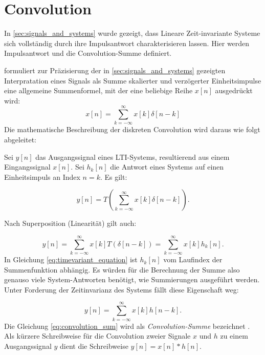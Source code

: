 \section{Convolution} 
\label{sec:convolution}
In \ref{sec:signals_and_systems} wurde gezeigt, dass Lineare Zeit-invariante Systeme sich vollständig durch ihre Impulsantwort
charakterisieren lassen. Hier werden Impulsantwort und die Convolution-Summe definiert.

\cite[Seite 11]{oppenheim1999} formuliert zur Präzisierung der in \ref{sec:signals_and_systems} gezeigten Interpratation eines Signals als Summe skalierter und verzögerter Einheitsimpulse eine allgemeine Summenformel, mit der eine beliebige Reihe $x[n]$ ausgedrückt wird:
\begin{equation}
    x[n]=\sum_{k=-\infty}^\infty x[k]\delta[n-k]
    \label{eq:scaled_unit_sum}
\end{equation}
Die mathematische Beschreibung der diskreten Convolution wird daraus wie folgt abgeleitet: 

Sei $y[n]$ das Ausgangssignal eines LTI-Systems, resultierend aus einem Eingangssignal $x[n]$. Sei $h_k[n]$ die Antwort eines Systems
auf einen Einheitsimpuls an Index $n=k$. Es gilt:

\begin{equation}
    y[n]=T\left( \sum_{k=-\infty}^{\infty}x[k]\delta[n-k] \right).
\end{equation}

Nach Superposition (Linearität) gilt auch:

\begin{equation}
    y[n]=\sum_{k=-\infty}^{\infty}x[k]T(\delta[n-k])=\sum_{k=-\infty}^{\infty}x[k]h_k[n].
    \label{eq:timevariant_equation}
\end{equation}
In Gleichung \ref{eq:timevariant_equation} ist $h_k[n]$ vom Laufindex der Summenfunktion abhängig. Es würden für die Berechnung der Summe also
genauso viele System-Antworten benötigt, wie Summierungen ausgeführt werden.
Unter Forderung der Zeitinvarianz des Systems fällt diese Eigenschaft weg:

\begin{equation}
    y[n]=\sum_{k=-\infty}^{\infty}x[k]h[n-k].
    \label{eq:convolution_sum}
\end{equation}
Die Gleichung \ref{eq:convolution_sum} wird als \textit{Convolution-Summe} bezeichnet \cite[Seite 22f]{oppenheim1999}. Als kürzere Schreibweise für 
die Convolution zweier Signale $x$ und $h$ zu einem Ausgangssignal $y$ dient die Schreibweise $y[n]=x[n]*h[n]$.

